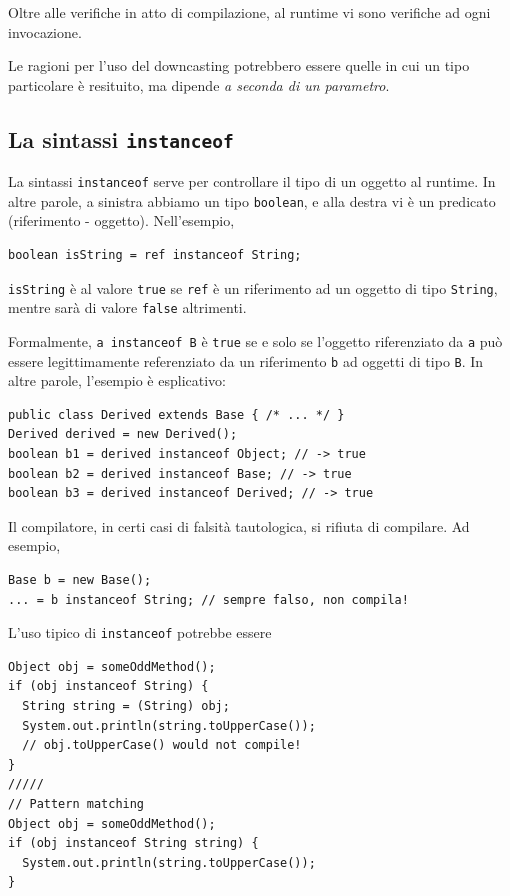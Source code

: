 \documentclass[\fontsizeclass,twocolumn]{\classname}
\theoremstyle{definition}
\theoremstyle{definition}
\begin{document}
Oltre alle verifiche in atto di compilazione, al runtime vi sono verifiche ad
ogni invocazione.

Le ragioni per l'uso del downcasting potrebbero essere quelle in cui un tipo
particolare è resituito, ma dipende \emph{a seconda di un parametro}.

\subsection{La sintassi \texttt{instanceof}}

La sintassi \texttt{instanceof} serve per controllare il tipo di un oggetto al
runtime. In altre parole, a sinistra abbiamo un tipo \texttt{boolean}, e alla destra vi è
un predicato (riferimento - oggetto). Nell'esempio,

\begin{lstlisting}
boolean isString = ref instanceof String;
\end{lstlisting}

\texttt{isString} è al valore \texttt{true} se \texttt{ref} è un riferimento ad
un oggetto di tipo \texttt{String}, mentre sarà di valore \texttt{false}
altrimenti.

Formalmente, \texttt{a instanceof B} è \texttt{true} se e solo se l'oggetto
riferenziato da \texttt{a} può essere legittimamente referenziato da un
riferimento \texttt{b} ad oggetti di tipo \texttt{B}. In altre parole, l'esempio
è esplicativo:

\begin{lstlisting}
public class Derived extends Base { /* ... */ }
Derived derived = new Derived();
boolean b1 = derived instanceof Object; // -> true
boolean b2 = derived instanceof Base; // -> true
boolean b3 = derived instanceof Derived; // -> true
\end{lstlisting}

Il compilatore, in certi casi di falsità tautologica, si rifiuta di compilare.
Ad esempio,

\begin{lstlisting}
Base b = new Base();
... = b instanceof String; // sempre falso, non compila!
\end{lstlisting}

L'uso tipico di \texttt{instanceof} potrebbe essere

\begin{lstlisting}
Object obj = someOddMethod();
if (obj instanceof String) {
  String string = (String) obj;
  System.out.println(string.toUpperCase());
  // obj.toUpperCase() would not compile!
}
/////
// Pattern matching
Object obj = someOddMethod();
if (obj instanceof String string) {
  System.out.println(string.toUpperCase());
}
\end{lstlisting}
\end{document}
